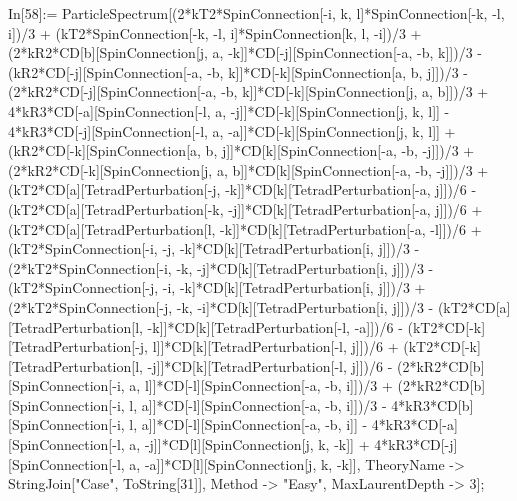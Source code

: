 In[58]:= ParticleSpectrum[(2*kT2*SpinConnection[-i, k, l]*SpinConnection[-k, -l, i])/3 + (kT2*SpinConnection[-k, -l, i]*SpinConnection[k, l, -i])/3 + (2*kR2*CD[b][SpinConnection[j, a, -k]]*CD[-j][SpinConnection[-a, -b, k]])/3 - (kR2*CD[-j][SpinConnection[-a, -b, k]]*CD[-k][SpinConnection[a, b, j]])/3 - (2*kR2*CD[-j][SpinConnection[-a, -b, k]]*CD[-k][SpinConnection[j, a, b]])/3 + 4*kR3*CD[-a][SpinConnection[-l, a, -j]]*CD[-k][SpinConnection[j, k, l]] - 4*kR3*CD[-j][SpinConnection[-l, a, -a]]*CD[-k][SpinConnection[j, k, l]] + (kR2*CD[-k][SpinConnection[a, b, j]]*CD[k][SpinConnection[-a, -b, -j]])/3 + (2*kR2*CD[-k][SpinConnection[j, a, b]]*CD[k][SpinConnection[-a, -b, -j]])/3 + (kT2*CD[a][TetradPerturbation[-j, -k]]*CD[k][TetradPerturbation[-a, j]])/6 - (kT2*CD[a][TetradPerturbation[-k, -j]]*CD[k][TetradPerturbation[-a, j]])/6 + (kT2*CD[a][TetradPerturbation[l, -k]]*CD[k][TetradPerturbation[-a, -l]])/6 + (kT2*SpinConnection[-i, -j, -k]*CD[k][TetradPerturbation[i, j]])/3 - (2*kT2*SpinConnection[-i, -k, -j]*CD[k][TetradPerturbation[i, j]])/3 - (kT2*SpinConnection[-j, -i, -k]*CD[k][TetradPerturbation[i, j]])/3 + (2*kT2*SpinConnection[-j, -k, -i]*CD[k][TetradPerturbation[i, j]])/3 - (kT2*CD[a][TetradPerturbation[l, -k]]*CD[k][TetradPerturbation[-l, -a]])/6 - (kT2*CD[-k][TetradPerturbation[-j, l]]*CD[k][TetradPerturbation[-l, j]])/6 + (kT2*CD[-k][TetradPerturbation[l, -j]]*CD[k][TetradPerturbation[-l, j]])/6 - (2*kR2*CD[b][SpinConnection[-i, a, l]]*CD[-l][SpinConnection[-a, -b, i]])/3 + (2*kR2*CD[b][SpinConnection[-i, l, a]]*CD[-l][SpinConnection[-a, -b, i]])/3 - 4*kR3*CD[b][SpinConnection[-i, l, a]]*CD[-l][SpinConnection[-a, -b, i]] - 4*kR3*CD[-a][SpinConnection[-l, a, -j]]*CD[l][SpinConnection[j, k, -k]] + 4*kR3*CD[-j][SpinConnection[-l, a, -a]]*CD[l][SpinConnection[j, k, -k]], TheoryName -> StringJoin["Case", ToString[31]], Method -> "Easy", MaxLaurentDepth -> 3]; 
